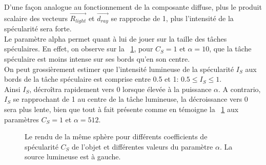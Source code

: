 \documentclass[11pt]{article}
\begin{document}
D'une façon analogue au fonctionnement de la composante diffuse, plus le produit scalaire des vecteurs $\overrightarrow{R_{light}}$ et $\overrightarrow{d_{ray}}$ se rapproche de 1, plus l'intensité de la spécularité sera forte.\\
Le paramètre alpha permet quant à lui de jouer sur la taille des tâches spéculaires. En effet, on observe sur la \figurename~\ref{differentSpecular}, pour $C_S = 1$ et $\alpha = 10$, que la tâche spéculaire est moins intense sur ses bords qu'en son centre.\\
On peut grossièrement estimer que l'intensité lumineuse de la spécularité $I_S$ aux bords de la tâche spéculaire est comprise entre 0.5 et 1: $0.5 \leqslant I_S \leqslant 1$.\\
Ainsi $I_S$, décroîtra rapidement vers 0 lorsque élevée à la puissance $\alpha$. A contrario, $I_S$ se rapprochant de 1 au centre de la tâche lumineuse, la décroissance vers 0 sera plus lente, bien que tout à fait présente comme en témoigne la \figurename~\ref{differentSpecular} aux paramètres $C_S = 1$ et $\alpha = 512$.

\begin{figure}[h!]

	\caption{Le rendu de la même sphère pour différents coefficients de spécularité $C_S$ de l'objet et différentes valeurs du paramètre $\alpha$. La source lumineuse est à gauche.}
	\label{differentSpecular}
\end{figure}
\FloatBarrier
\end{document}
